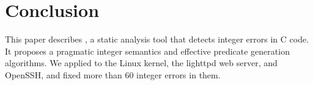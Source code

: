 \section{Conclusion}
\label{s:concl}

This paper describes \sys, a static analysis tool that detects
integer errors in C code.  It proposes a pragmatic integer
semantics and effective predicate generation algorithms.
We applied \sys to the Linux kernel, the lighttpd web server, and
OpenSSH, and fixed more than 60 integer errors in them.
